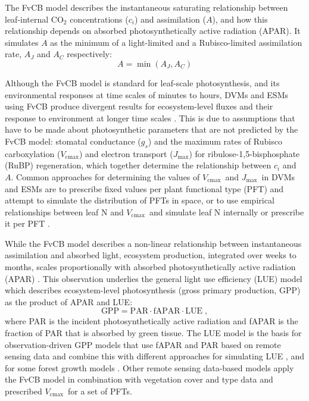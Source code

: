 \documentclass{myreport}
\newcommand{\vcmax}{$V_{\text{cmax}}$}
\newcommand{\jmax}{$J_{\text{max}}$}
\begin{document}
The FvCB model describes the instantaneous saturating relationship between leaf-internal CO$_2$ concentrations ($c_i$) and assimilation ($A$), and how this relationship depends on absorbed photosynthetically active radiation (APAR). It simulates $A$ as the minimum of a light-limited and a Rubisco-limited assimilation rate, $A_J$ and $A_C$ respectively:
\begin{equation}
    A = \min(A_J, A_C)
\end{equation}

Although the FvCB model is standard for leaf-scale photosynthesis, and its environmental responses at time scales of minutes to hours, DVMs and ESMs using FvCB produce divergent results for ecosystem-level fluxes and their response to environment at longer time scales \citep{rogers17}. This is due to assumptions that have to be made about photosynthetic parameters that are not predicted by the FvCB model: stomatal conductance ($g_s$) and the maximum rates of Rubisco carboxylation (\vcmax ) and electron transport (\jmax ) for ribulose-1,5-bisphosphate (RuBP) regeneration, which together determine the relationship between $c_i$ and $A$. Common approaches for determining the values of \vcmax\ and \jmax\ in DVMs and ESMs are to prescribe fixed values per plant functional type (PFT) and attempt to simulate the distribution of PFTs in space, or to use empirical relationships between leaf N and \vcmax\ and simulate leaf N internally or prescribe it per PFT \citep{smithdukes13gcb, rogers14}. 

While the FvCB model describes a non-linear relationship between instantaneous assimilation and absorbed light, ecosystem production, integrated over weeks to months, scales proportionally with absorbed photosynthetically active radiation (APAR) \citep{monteith72, medlyn98}. This observation underlies the general light use efficiency (LUE) model which describes ecosystem-level photosynthesis (gross primary production, GPP) as the product of APAR and LUE:
\begin{equation}
\label{eq:luemodel}
\text{GPP} = \text{PAR} \cdot \text{fAPAR} \cdot \text{LUE} \;,
\end{equation}
where PAR is the incident photosynthetically active radiation and fAPAR is the fraction of PAR that is absorbed by green tissue. The LUE model is the basis for observation-driven GPP models that use fAPAR and PAR based on remote sensing data and combine this with different approaches for simulating LUE \citep{running04, Zhang2017-yr, field95rse}, and for some forest growth models \citep{landsberg97fem}. Other remote sensing data-based models \citep{jiang16rse} apply the FvCB model in combination with vegetation cover and type data and prescribed \vcmax\ for a set of PFTs.
\end{document}
